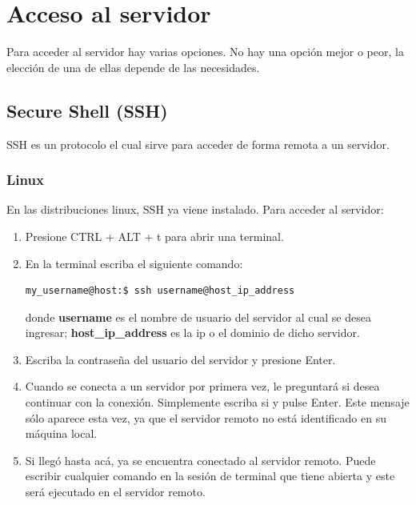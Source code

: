 \documentclass[12pt]{article}
\begin{document}
\maketitle
\tableofcontents
\section{Acceso al servidor}
Para acceder al servidor hay varias opciones. No hay una opci\'on mejor o peor, la elecci\'on de una de ellas depende de las necesidades.
\subsection{Secure Shell (SSH)}
SSH es un protocolo el cual sirve para acceder de forma remota a un servidor.
\subsubsection{Linux}
En las distribuciones linux, SSH ya viene instalado. Para acceder al servidor:
\begin{enumerate}
    \item Presione CTRL + ALT + t para abrir una terminal.
    \item En la terminal escriba el siguiente comando:
          \begin{verbatim}
my_username@host:$ ssh username@host_ip_address
\end{verbatim}
          donde \textbf{username} es el nombre de usuario del servidor al cual se desea ingresar; \textbf{host\_ip\_address} es la ip o el dominio de dicho servidor.
    \item Escriba la contrase\~na del usuario del servidor y presione Enter.
    \item Cuando se conecta a un servidor por primera vez, le preguntar\'a si desea continuar con la conexi\'on. Simplemente escriba si y pulse Enter. Este mensaje
          s\'olo aparece esta vez, ya que el servidor remoto no est\'a identificado en su m\'aquina local.
    \item Si lleg\'o hasta ac\'a, ya se encuentra conectado al servidor remoto. Puede escribir cualquier comando en la sesi\'on de terminal que
          tiene abierta y este ser\'a ejecutado en el servidor remoto.
\end{enumerate}
\end{document}
